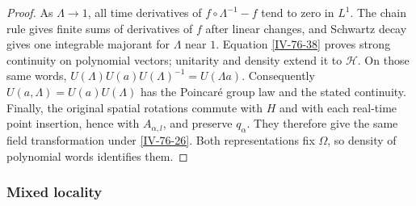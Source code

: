 \documentclass[11pt,letterpaper,reqno]{amsart}
\theoremstyle{definition}
\theoremstyle{remark}
\begin{document}
\begin{proof}
As $\Lambda\to1$, all time derivatives of
$f\circ\Lambda^{-1}-f$ tend to zero in $L^1$.
The chain rule gives finite sums of derivatives of $f$
after linear changes, and Schwartz decay gives one
integrable majorant for $\Lambda$ near $1$.
Equation \eqref{IV-76-38} proves strong continuity on
polynomial vectors; unitarity and density extend it to
$\mathcal H$. On those same words,
$U(\Lambda)U(a)U(\Lambda)^{-1}=U(\Lambda a)$.
Consequently $U(a,\Lambda)=U(a)U(\Lambda)$ has the
Poincar\'e group law and the stated continuity.
Finally, the original spatial rotations commute with
$H$ and with each real-time point insertion, hence with
$A_{\alpha,l}$, and preserve $q_\alpha$. They therefore
give the same field transformation under
\eqref{IV-76-26}. Both representations fix $\Omega$,
so density of polynomial words identifies them.
\end{proof}

\subsubsection{Mixed locality}
\end{document}
